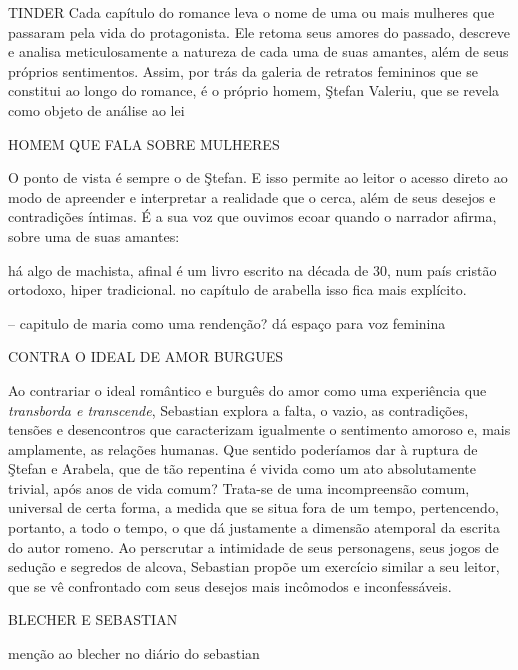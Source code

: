 
TINDER
Cada capítulo do romance leva o nome de uma ou mais mulheres que passaram
pela vida do protagonista. Ele retoma seus amores do passado,
descreve e analisa meticulosamente a natureza de cada uma de suas
amantes, além de seus próprios sentimentos.
Assim, por trás da galeria de retratos femininos que se constitui ao
longo do romance, é o próprio homem, Ştefan Valeriu, que se revela como
objeto de análise ao lei


HOMEM QUE FALA SOBRE MULHERES

O ponto de vista é sempre o de Ştefan. E isso permite ao leitor o acesso direto ao modo de
apreender e interpretar a realidade que o cerca, além de seus desejos
e contradições íntimas. É a sua voz que ouvimos ecoar quando
o narrador afirma, sobre uma de suas amantes:

há algo de machista, afinal é um livro escrito na década de 30, num país cristão ortodoxo, hiper tradicional.
no capítulo de arabella isso fica mais explícito.

-- capitulo de maria como uma rendenção? dá espaço para voz feminina




CONTRA O IDEAL DE AMOR BURGUES


Ao contrariar o ideal romântico e burguês do amor como uma experiência
que \textit{transborda e transcende}, Sebastian explora a falta, o vazio, as
contradições, tensões e desencontros que caracterizam igualmente o
sentimento amoroso e, mais amplamente, as relações humanas. Que sentido
poderíamos dar à ruptura de Ştefan e Arabela, que de tão repentina é
vivida como um ato absolutamente trivial, após anos de vida comum?
Trata-se de uma incompreensão comum, universal de certa forma, a medida
que se situa fora de um tempo, pertencendo, portanto, a todo o tempo, o
que dá justamente a dimensão atemporal da escrita do autor romeno. Ao
perscrutar a intimidade de seus personagens, seus jogos de sedução e
segredos de alcova, Sebastian propõe um exercício similar a seu
leitor, que se vê confrontado com seus desejos mais incômodos e
inconfessáveis.


BLECHER E SEBASTIAN

menção ao blecher no diário do sebastian